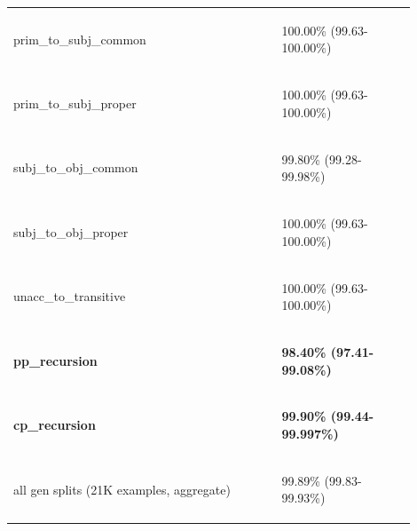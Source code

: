 \documentclass[11pt]{article}
\begin{document}
\begin{table}
\begin{tabular}{p{0.6\linewidth} p{0.3\linewidth}}
\begin{tiny}prim\_to\_subj\_common\end{tiny} & \begin{tiny} 100.00\% (99.63-100.00\%)\end{tiny} \\
\begin{tiny}prim\_to\_subj\_proper\end{tiny} & \begin{tiny} 100.00\% (99.63-100.00\%)\end{tiny} \\
\begin{tiny}subj\_to\_obj\_common\end{tiny} & \begin{tiny} 99.80\% (99.28-99.98\%)\end{tiny} \\
\begin{tiny}subj\_to\_obj\_proper\end{tiny} & \begin{tiny} 100.00\% (99.63-100.00\%)\end{tiny} \\
\begin{tiny}unacc\_to\_transitive\end{tiny} & \begin{tiny} 100.00\% (99.63-100.00\%)\end{tiny} \\
\begin{tiny}\textbf{pp\_recursion}\end{tiny} & \begin{tiny} \textbf{98.40\% (97.41-99.08\%)}\end{tiny} \\
\begin{tiny}\textbf{cp\_recursion}\end{tiny} & \begin{tiny} \textbf{99.90\% (99.44-99.997\%)}\end{tiny} \\
\hline
\begin{tiny}all gen splits (21K examples, aggregate)\end{tiny} & \begin{tiny} 99.89\% (99.83-99.93\%)\end{tiny} \\
\hline
\end{tabular}

\end{table}
\end{document}
